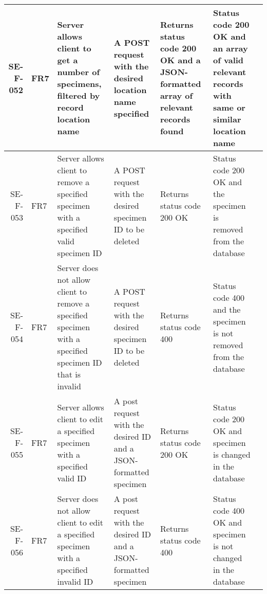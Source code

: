 \begin{landscape}
\begin{longtable}{|r|l|p{4cm}|p{4cm}|p{4cm}|p{4cm}|l|}
		SE-F-052 & FR7 & Server allows client to get a number of specimens, filtered by record location name & A POST request with the desired location name specified & Returns status code 200 OK and a JSON-formatted array of relevant records found & Status code 200 OK and an array of valid relevant records with same or similar location name & \\ \hline
		SE-F-053 & FR7 & Server allows client to remove a specified specimen with a specified valid specimen ID &  A POST request with the desired specimen ID to be deleted &  Returns status code 200 OK &  Status code 200 OK and the specimen is removed from the database & \\ \hline
		SE-F-054 & FR7 & Server does not allow client to remove a specified specimen with a specified specimen ID that is invalid&  A POST request with the desired specimen ID to be deleted &  Returns status code 400 &  Status code 400 and the specimen is not removed from the database & \\ \hline
		SE-F-055 & FR7 & Server allows client to edit a specified specimen with a specified valid ID & A post request with the desired ID and a JSON-formatted specimen & Returns status code 200 OK  & Status code 200 OK and specimen is changed in the database & \\ \hline
		SE-F-056 & FR7 & Server does not allow client to edit a specified specimen with a specified invalid ID & A post request with the desired ID and a JSON-formatted specimen & Returns status code 400  & Status code 400 OK and specimen is not changed in the database & \\ \hline
		\end{longtable}
	\end{landscape}
